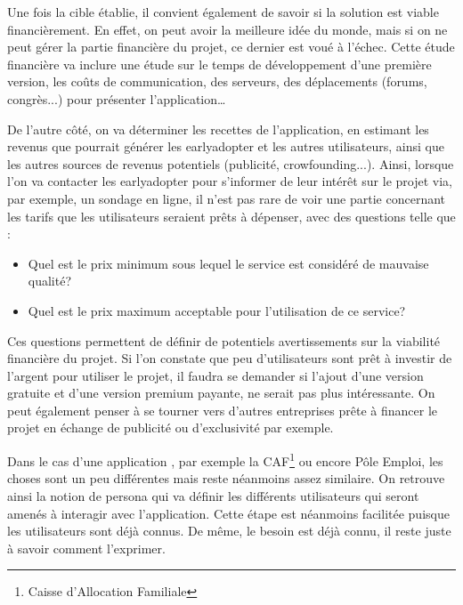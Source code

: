 Une fois la cible établie, il convient également de savoir si la solution est viable financièrement. En effet, on peut avoir la meilleure idée du monde, mais si on ne peut gérer la partie financière du projet, ce dernier est voué à l'échec. Cette étude financière va inclure une étude sur le temps de développement d'une première version, les coûts de communication, des serveurs, des déplacements (forums, congrès...) pour présenter l'application\ldots

De l'autre côté, on va déterminer les recettes de l'application, en estimant les revenus que pourrait générer les \gls{earlyadopter} et les autres utilisateurs, ainsi que les autres sources de revenus potentiels (publicité, crowfounding...). Ainsi, lorsque l'on va contacter les \gls{earlyadopter} pour s'informer de leur intérêt sur le projet via, par exemple, un sondage en ligne, il n'est pas rare de voir une partie concernant les tarifs que les utilisateurs seraient prêts à dépenser, avec des questions telle que :

\begin{itemize}
	\setlength\itemsep{-0.5em}
	\item Quel est le prix minimum sous lequel le service est considéré de mauvaise qualité?
	\item Quel est le prix maximum acceptable pour l'utilisation de ce service?
\end{itemize}

Ces questions permettent de définir de potentiels avertissements sur la viabilité financière du projet. Si l'on constate que peu d'utilisateurs sont prêt à investir de l'argent pour utiliser le projet, il faudra se demander si l'ajout d'une version gratuite et d'une version premium payante, ne serait pas plus intéressante. On peut également penser à se tourner vers d'autres entreprises prête à financer le projet en échange de publicité ou d'exclusivité par exemple.

Dans le cas d'une application , par exemple la CAF\footnote{Caisse d'Allocation Familiale} ou encore Pôle Emploi, les choses sont un peu différentes mais reste néanmoins assez similaire. On retrouve ainsi la notion de \gls{persona} qui va définir les différents utilisateurs qui seront amenés à interagir avec l'application. Cette étape est néanmoins facilitée puisque les utilisateurs sont déjà connus. De même, le besoin est déjà connu, il reste juste à savoir comment l'exprimer.

